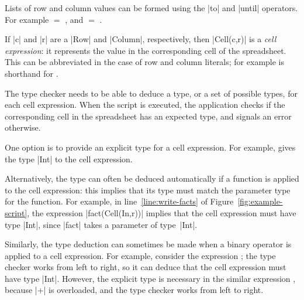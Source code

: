 Lists of row and column values can be formed using the |to| and |until|
operators.  For example  $=$ \SCALA{[#B,#C,#D]}, and  $=$ \SCALA{[#2,#3]}.


If |c| and |r| are a |Row| and |Column|, respectively, then |Cell(c,r)| is a
\emph{cell expression}: it represents the value in the corresponding cell of
the spreadsheet.  This can be abbreviated in the case of row and column
literals; for example  is shorthand for .

The type checker needs to be able to deduce a type, or a set of possible
types, for each cell expression.  When the script is executed, the application
checks if the corresponding cell in the spreadsheet has an expected type, and
signals an error otherwise.

One option is to provide an explicit type for a cell expression.  For example,
 gives the type |Int| to the cell expression.

Alternatively, the type can often be deduced automatically if a function is
applied to the cell expression: this implies that its type must match the
parameter type for the function.  For example, in line~\ref{line:write-facts}
of Figure~\ref{fig:example-script}, the expression |fact(Cell(In,r))| implies
that the cell expression must have type |Int|, since |fact| takes a parameter
of type~|Int|.

Similarly, the type deduction can sometimes be made when a binary operator is
applied to a cell expression.  For example, consider the expression ; the type checker works from left to right, so it can deduce that the
cell expression must have type |Int|.  However, the explicit type is necessary
in the similar expression , because |+| is overloaded, and
the type checker works from left to right.

